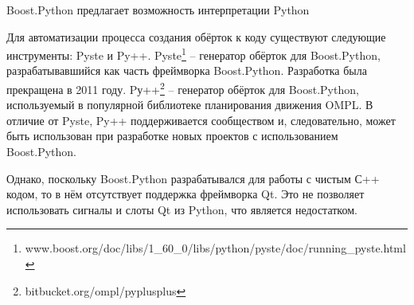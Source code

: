 \documentclass[14pt]{matmex-diploma-custom}
\begin{document}
Boost.Python предлагает возможность интерпретации Python

Для автоматизации процесса создания обёрток к коду существуют следующие инструменты: Pyste и Py++. Pyste\footnote{www.boost.org/doc/libs/1\_60\_0/libs/python/pyste/doc/running\_pyste.html} -- генератор обёрток для Boost.Python, разрабатывавшийся как часть фреймворка Boost.Python. Разработка была прекращена в 2011 году. Pу++\footnote{bitbucket.org/ompl/pyplusplus} -- генератор обёрток для Boost.Python, используемый в популярной библиотеке планирования движения OMPL\cite{sucan2012theOMPL}. В отличие от Pyste, Py++ поддерживается сообществом и, следовательно, может быть использован при разработке новых проектов с использованием Boost.Python.


Однако, поскольку Boost.Python разрабатывался для работы с чистым С++ кодом, то в нём отсутствует поддержка фреймворка Qt. Это не позволяет использовать сигналы и слоты Qt из Python, что является недостатком. 





\end{document}
